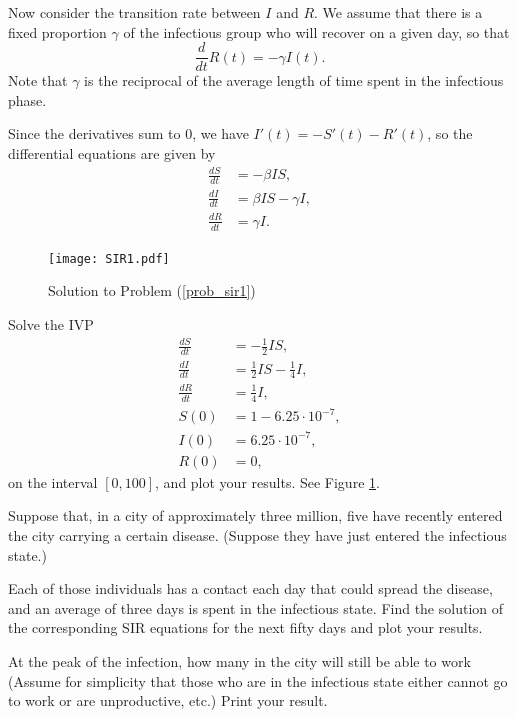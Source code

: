  Now consider the transition rate between $I$ and $R$.
We assume that there is a fixed proportion $\gamma$ of the infectious group who will recover on a given day, so that
\[\frac{d}{dt}R(t) = -\gamma I(t).\]
Note that $\gamma$ is the reciprocal of the average length of time spent in the infectious phase.

Since the derivatives sum to $0$, we have $I'(t) = - S'(t) - R'(t)$, so the  differential equations are given by
\begin{align*}
\frac{dS}{dt} &=-\beta IS ,\\
\frac{dI}{dt} &= \beta I S-\gamma I,\\
\frac{dR}{dt} &=\gamma I.
\end{align*}


\begin{figure}[ht]
\centering
\texttt{[image: SIR1.pdf]}
\caption{Solution to Problem (\ref{prob_sir1})}
\label{sir1}
\end{figure}


\begin{problem}
Solve the IVP
\begin{align*}
\frac{dS}{dt} &=-\frac{1}{2} IS ,\\
\frac{dI}{dt} &= \frac{1}{2} I S-\frac{1}{4} I, \\
\frac{dR}{dt} &=\frac{1}{4} I,\\
S(0) &= 1-6.25\cdot10^{-7},\\
I(0) &= 6.25\cdot10^{-7},\\
R(0) &=0,
\end{align*}
on the interval $[0,100]$, and plot your results.  See Figure \ref{sir1}. \label{prob_sir1}
\end{problem}



\begin{problem}
Suppose that, in a city of approximately three million, five have recently entered the city carrying a certain disease.
(Suppose they have just entered the infectious state.)

Each of those individuals has a contact each day that could spread the disease, and an average of three days is spent in the infectious state.
Find the solution of the corresponding SIR equations for the next fifty days and plot your results.


At the peak of the infection, how many in the city will still be able to work (Assume for simplicity that those who are in the infectious state either cannot go to work or are unproductive, etc.)
Print your result.

\end{problem}


